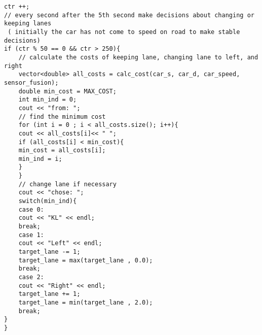 \documentclass[12pt]{article}
\begin{document}
\begin{verbatim}
ctr ++;
// every second after the 5th second make decisions about changing or keeping lanes
 ( initially the car has not come to speed on road to make stable decisions)
if (ctr % 50 == 0 && ctr > 250){
	// calculate the costs of keeping lane, changing lane to left, and right
	vector<double> all_costs = calc_cost(car_s, car_d, car_speed, sensor_fusion);	
	double min_cost = MAX_COST;
	int min_ind = 0;
	cout << "from: ";
	// find the minimum cost
	for (int i = 0 ; i < all_costs.size(); i++){
	cout << all_costs[i]<< " ";
	if (all_costs[i] < min_cost){
	min_cost = all_costs[i];					
	min_ind = i;
	}
	}
	// change lane if necessary 
	cout << "chose: ";
	switch(min_ind){
	case 0:
	cout << "KL" << endl;
	break;
	case 1:
	cout << "Left" << endl;
	target_lane -= 1;
	target_lane = max(target_lane , 0.0);
	break;
	case 2:
	cout << "Right" << endl;
	target_lane += 1;
	target_lane = min(target_lane , 2.0);
	break;
}
}
\end{verbatim}
\end{document}
